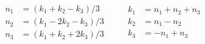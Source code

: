 \begin{equation}
  \begin{array}{rl}
n_1&= (k_1 +k_2 -k_3)/3 \\
n_2&= (k_1 -2 k_2 -k_3)/3 \\
n_3&= (k_1 +k_2 +2k_3)/3 \\
  \end{array} \qquad
  \begin{array}{rl}
k_1&= n_1 +n_2 +n_3 \\
k_2&= n_1 -n_2  \\
k_3&= -n_1 +n_3 \\
  \end{array}
\end{equation}


